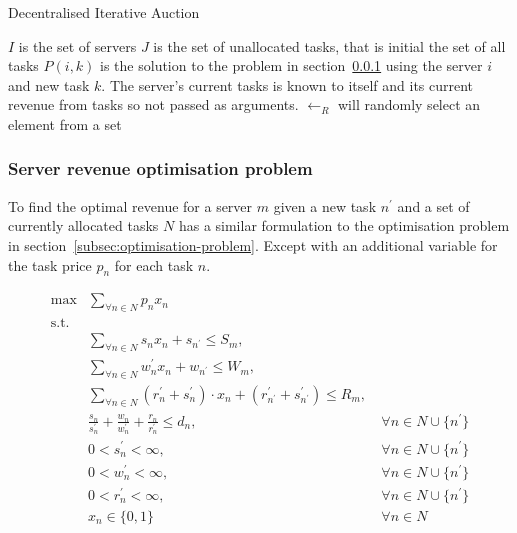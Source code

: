 \begin{algorithm}
    \caption{Decentralised Iterative Auction}
    \label{alg:dia}
    \begin{algorithmic}
        \REQUIRE $I$ is the set of servers
        \REQUIRE $J$ is the set of unallocated tasks, that is initial the set of all tasks
        \REQUIRE $P(i, k)$ is the solution to the problem in section~\ref{subsubsec:decentralised-iterative-problem}
            using the server $i$ and new task $k$. The server's current tasks is known to itself and its current
            revenue from tasks so not passed as arguments.
        \REQUIRE $\leftarrow_R$ will randomly select an element from a set

            \ENDIF
        \ENDWHILE
    \end{algorithmic}
\end{algorithm}

\subsubsection{Server revenue optimisation problem}
\label{subsubsec:decentralised-iterative-problem}
To find the optimal revenue for a server $m$ given a new task $n^{'}$ and a set of currently allocated tasks $N$ has a
similar formulation to the optimisation problem in section~\ref{subsec:optimisation-problem}. Except with an additional
variable for the task price $p_n$ for each task $n$.

\begin{align}
    \max & \sum_{\forall n \in N} p_n x_n\label{eq:dia-objective}\\
    \mbox{s.t.} \nonumber \\
    & \sum_{\forall n \in N} s_n x_n + s_{n^{'}} \leq S_m,\label{eq:dia-server-storage-constraint}\\
    & \sum_{\forall n \in N} w^{'}_n x_n + w_{n^{'}} \leq W_m, \label{eq:dia-server-computation-constraint}\\
    & \sum_{\forall n \in N} (r^{'}_n + s^{'}_n) \cdot x_n + (r^{'}_{n^{'}} + s^{'}_{n^{'}}) \leq R_m, \label{eq:dia-server-communication-constraint}\\
    & \frac{s_n}{s^{'}_n} + \frac{w_n}{w^{'}_n} + \frac{r_n}{r^{'}_n} \leq d_n, &~ \forall n \in N \cup \{n^{'}\} \label{eq:dia-task-deadline}\\
    & 0 < s^{'}_n < \infty, &~ \forall{n \in N \cup \{n^{'}\}} \label{eq:dia-loading-speeds}\\
    & 0 < w^{'}_n < \infty, &~ \forall{n \in N \cup \{n^{'}\}} \label{eq:dia-compute-speeds}\\
    & 0 < r^{'}_n < \infty, &~ \forall{n \in N \cup \{n^{'}\}} \label{eq:dia-sending-speeds}\\
    & x_n \in \{0,1\} &~ \forall{n \in N} \label{eq:dia-task-allocation}
\end{align}

